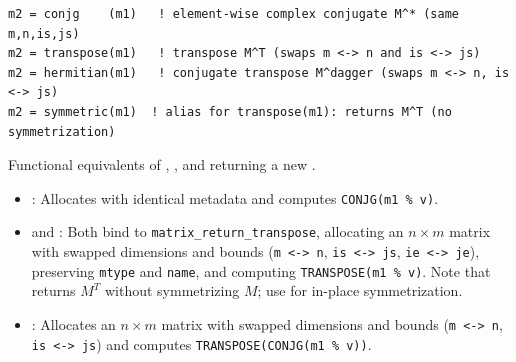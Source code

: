
\lstset{language=[95]Fortran}
\begin{lstlisting}
m2 = conjg    (m1)   ! element-wise complex conjugate M^* (same m,n,is,js)
m2 = transpose(m1)   ! transpose M^T (swaps m <-> n and is <-> js)
m2 = hermitian(m1)   ! conjugate transpose M^dagger (swaps m <-> n, is <-> js)
m2 = symmetric(m1)  ! alias for transpose(m1): returns M^T (no symmetrization)
\end{lstlisting}

Functional equivalents of , , and  returning a new .

\begin{itemize}
  \item {}: Allocates  with identical metadata and computes \texttt{CONJG(m1 \% v)}.
  \item {} and : Both bind to \texttt{matrix\_return\_transpose}, allocating an $n \times m$ matrix with swapped dimensions and bounds (\texttt{m <-> n}, \texttt{is <-> js}, \texttt{ie <-> je}), preserving \texttt{mtype} and \texttt{name}, and computing \texttt{TRANSPOSE(m1 \% v)}. Note that  returns $M^T$ without symmetrizing $M$; use  for in-place symmetrization.
  \item {}: Allocates an $n \times m$ matrix with swapped dimensions and bounds (\texttt{m <-> n}, \texttt{is <-> js}) and computes \texttt{TRANSPOSE(CONJG(m1 \% v))}.
\end{itemize}

\begin{description}[leftmargin=2.2cm, style=nextline]
\end{description}

